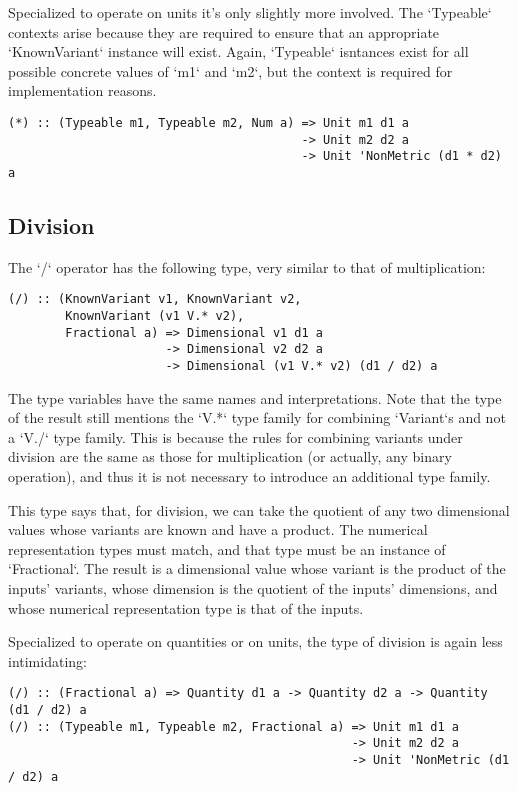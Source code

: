 \documentclass[11pt]{report}
\begin{document}
Specialized to operate on units it's only slightly more involved. The `Typeable` contexts arise because they are
required to ensure that an appropriate `KnownVariant` instance will exist. Again, `Typeable` isntances exist for all
possible concrete values of `m1` and `m2`, but the context is required for implementation reasons.

\begin{lstlisting}
(*) :: (Typeable m1, Typeable m2, Num a) => Unit m1 d1 a
                                         -> Unit m2 d2 a
                                         -> Unit 'NonMetric (d1 * d2) a
\end{lstlisting}

\subsection{Division}

The `/` operator has the following type, very similar to that of multiplication:

\begin{lstlisting}
(/) :: (KnownVariant v1, KnownVariant v2,
        KnownVariant (v1 V.* v2),
        Fractional a) => Dimensional v1 d1 a
                      -> Dimensional v2 d2 a
                      -> Dimensional (v1 V.* v2) (d1 / d2) a
\end{lstlisting}

The type variables have the same names and interpretations. Note that the type of the result still mentions the
`V.*` type family for combining `Variant`s and not a `V./` type family. This is because the rules for combining variants
under division are the same as those for multiplication (or actually, any binary operation), and thus it is not necessary
to introduce an additional type family.

This type says that, for division, we can take the quotient of any two dimensional values whose variants are known and have a product.
The numerical representation types must match, and that type must be an instance of `Fractional`. The result is a dimensional value
whose variant is the product of the inputs' variants, whose dimension is the quotient of the inputs' dimensions, and whose numerical representation
type is that of the inputs.

Specialized to operate on quantities or on units, the type of division is again less intimidating:

\begin{lstlisting}
(/) :: (Fractional a) => Quantity d1 a -> Quantity d2 a -> Quantity (d1 / d2) a
(/) :: (Typeable m1, Typeable m2, Fractional a) => Unit m1 d1 a
                                                -> Unit m2 d2 a
                                                -> Unit 'NonMetric (d1 / d2) a
\end{lstlisting}
\end{document}
